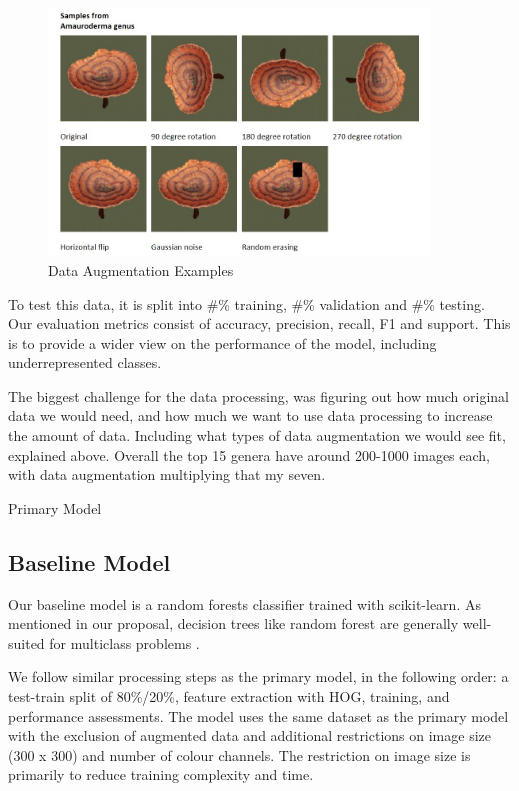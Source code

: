 \documentclass{article} %
\begin{document}
\begin{figure}[h]
    \begin{center}
    \includegraphics[width=0.9\textwidth]{figures/data_aug.jpg}
    \end{center}
    \caption{Data Augmentation Examples}
\end{figure}

\FloatBarrier

To test this data, it is split into \#\% training, \#\% validation and \#\% testing. Our evaluation metrics consist of accuracy, precision, recall, F1 and support. This is to provide a wider view on the performance of the model, including underrepresented classes.

The biggest challenge for the data processing, was figuring out how much original data we would need, and how much we want to use data processing to increase the amount of data. Including what types of data augmentation we would see fit, explained above. Overall the top 15 genera have around 200-1000 images each, with data augmentation multiplying that my seven.




Primary Model


\subsection{Baseline Model}
Our baseline model is a random forests classifier trained with scikit-learn. As mentioned in our proposal, decision trees like random forest are generally well-suited for multiclass problems \citep{GallRazaviEtAl.IntroductionRandomForests.2012}.

We follow similar processing steps as the primary model, in the following order: a test-train split of 80\%/20\%, feature extraction with HOG, training, and performance assessments. The model uses the same dataset as the primary model with the exclusion of augmented data and additional restrictions on image size (300 x 300) and number of colour channels. The restriction on image size is primarily to reduce training complexity and time.
\end{document}
